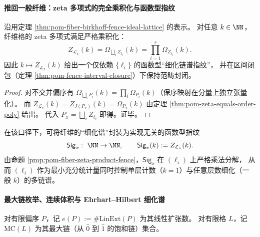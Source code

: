 

\paragraph{推回一般纤维：zeta 多项式的完全乘积化与函数型指纹}
\begin{proposition}[一般纤维的多链谱乘积闭合]\label{prop:pom-fiber-zeta-product-fence}
沿用定理 \ref{thm:pom-fiber-birkhoff-fence-ideal-lattice} 的表示。
对任意 \(k\in\NN\)，纤维格的 zeta 多项式满足严格乘积化：
\[
Z_{\mathcal L_x}(k)=\Omega_{\bigsqcup_i Z_{\ell_i}}(k)=\prod_{i=1}^r \Omega_{Z_{\ell_i}}(k).
\]
因此 \(k\mapsto Z_{\mathcal L_x}(k)\) 给出一个仅依赖 \(\{\ell_i\}\) 的函数型“细化链谱指纹”，
并在区间闭包（定理 \ref{thm:pom-fence-interval-closure}）下保持范畴封闭。
\end{proposition}
\begin{proof}
对不交并偏序有 \(\Omega_{\bigsqcup_i P_i}(k)=\prod_i \Omega_{P_i}(k)\)（保序映射在分量上独立张量化）。
而 \(Z_{\mathcal L_x}(k)=Z_{J(P_x)}(k)=\Omega_{P_x}(k)\) 由定理 \ref{thm:pom-zeta-equals-order-poly} 给出。
代入 \(P_x=\bigsqcup_i Z_{\ell_i}\) 即得。证毕。
\end{proof}

\begin{remark}[函数型谱指纹]\label{rem:pom-fence-sig-function}
在该口径下，可将纤维的“细化谱”封装为实现无关的函数型指纹
\[
\mathsf{Sig}_x:\ \NN\to\NN,\qquad
\mathsf{Sig}_x(k):=Z_{\mathcal L_x}(k).
\]
由命题 \ref{prop:pom-fiber-zeta-product-fence}，\(\mathsf{Sig}_x\) 在 \((\ell_i)\) 上严格乘法分解，
从而 \((\ell_i)\) 作为最小充分统计量同时控制单层计数（\(k=1\)）与任意层数细化（一般 \(k\)）的多链谱。
\end{remark}

\paragraph{最大链枚举、连续体积与 Ehrhart--Hilbert 细化谱}

\begin{definition}[线性扩张数与最大链数]\label{def:pom-fence-linext-maxchain}
对有限偏序 \(P\)，记 \(e(P):=\#\mathrm{LinExt}(P)\) 为其线性扩张数。
对有限格 \(L\)，记 \(\mathrm{MC}(L)\) 为其最大链（从 \(\hat0\) 到 \(\hat1\) 的饱和链）集合。
\end{definition}

